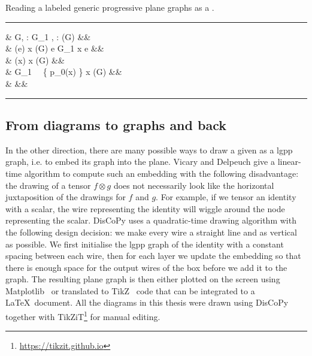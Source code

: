 \begin{python}\label{listing:lgpp2diagram}
{\normalfont Reading a labeled generic progressive plane graphs as a .}
\vspace{5pt}
\hrule
\vspace{-15pt}
\begin{flalign*}
 \s &  \s G, \s \lambda : G_1 \to {}, \s \lambda : \boxes(G) \to {} \s {}&&\\
& \py{dom = [} \s \lambda(e) \s {} \s x \in \dom(G) \s {} \s e \in G_1 \s {} \s x \in \partial e \s \py{]}&&\\
& \py{boxes = [} \s \lambda(x) \s {} \s x \in \boxes(G) \s \py{]}&&\\
& \py{offsets = [len(} \s G_1 \ \cap \ \{ p_0(x) \} \times \R \s {} \s x \in \boxes(G) \s \py{]}&&\\
&  &&
\vspace{-10pt}
\end{flalign*}
\hrule
\end{python}

\subsection{From diagrams to graphs and back}

In the other direction, there are many possible ways to draw a given  as a lgpp graph, i.e. to embed its graph into the plane.
Vicary and Delpeuch \cite{VicaryDelpeuch22} give a linear-time algorithm to compute such an embedding with the following disadvantage: the drawing of a tensor $f \otimes g$ does not necessarily look like the horizontal juxtaposition of the drawings for $f$ and $g$.
For example, if we tensor an identity with a scalar, the wire representing the identity will wiggle around the node representing the scalar.
DisCoPy uses a quadratic-time drawing algorithm with the following design decision: we make every wire a straight line and as vertical as possible.
We first initialise the lgpp graph of the identity with a constant spacing between each wire, then for each layer we update the embedding so that there is enough space for the output wires of the box before we add it to the graph.
The resulting plane graph is then either plotted on the screen using Matplotlib~\cite{Hunter07} or translated to TikZ~\cite{Tantau13} code that can be integrated to a \LaTeX \ document.
All the diagrams in this thesis were drawn using DisCoPy together with TikZiT\footnote{\url{https://tikzit.github.io}} for manual editing.


